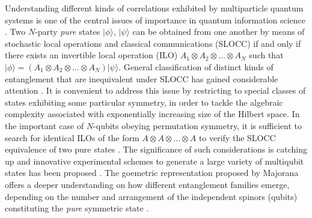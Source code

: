 Understanding different kinds of correlations exhibited by multiparticle quantum systems is one of the  central issues of importance in quantum information science \cite{Niel}. Two $N$-party {\em pure} states $\vert\phi\rangle$, $\vert \psi\rangle$  can be obtained from one another by means of stochastic local operations and classical communications (SLOCC)  if and only if there exists an invertible local operation (ILO) \cite{Dur} $A_1\otimes A_2\otimes \ldots \otimes A_N$ such that $\vert \phi\rangle=\left(A_1\otimes A_2\otimes \ldots \otimes A_N\right)\vert\psi\rangle$. General classification of distinct kinds of entanglement that are inequivalent under SLOCC has gained considerable attention \cite{Dur,Ver,Lamata}. It is convenient to address this issue by restricting to special classes of states exhibiting some particular symmetry, in order to tackle the algebraic complexity associated with exponentially increasing size of the Hilbert space. In the important case of  $N$-qubits obeying permutation symmetry, it is sufficient to search for identical ILOs of the form $A\otimes A\otimes\ldots \otimes A$ to verify the SLOCC equivalence of two pure states \cite{solano,bastin}. The significance of such considerations is catching up and  innovative experimental schemes to generate a large variety of multiqubit states has been proposed \cite{newexpt1,newexpt2}. The goemetric representation proposed by Majorana \cite{majorana} offers a deeper understanding on how different entanglement families emerge, depending on the number and arrangement of the independent spinors (qubits) constituting the {\em pure} symmetric state \cite{solano}. 

